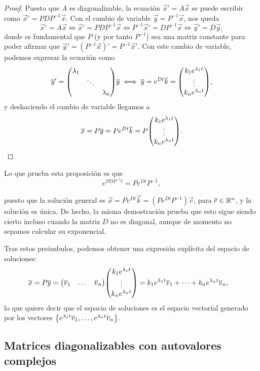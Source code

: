 \documentclass[../ecuaciones_diferenciales.tex]{subfiles}
\begin{document}
\begin{proof}
	Puesto que \(A\) es diagonalizable, la ecuación \(\vec{x}' = A\vec{x}\) 
	se puede escribir como
	\(\vec{x}' = P D P^{-1} \vec{x}\). Con el cambio de variable 
	\(\vec{y} = P^{-1}\vec{x}\), nos queda
	\[\vec{x}' = A\vec{x} \iff 
		\vec{x}' = PDP^{-1}\vec{x} \iff 
		P^{-1}\vec{x}' = DP^{-1}\vec{x} \iff \vec{y}' = D\vec{y},\]
	donde es fundamental que \(P\) (y por tanto \(P^{-1}\)) sea una matriz constante
	para poder afirmar que \(\vec{y}' = (P^{-1}\vec{x})' = P^{-1}\vec{x}'\). 
	Con este cambio de variable, podemos expresar la ecuación como
	\[\vec{y}' = \mat{\lambda_1 && \\ & \ddots & \\ && \lambda_n} \vec{y} \iff
		\vec{y} = e^{Dt}\vec{k} 
		= \mat{k_1 e^{\lambda_1 t} \\ \vdots \\ k_n e^{\lambda_n t}},\]
    y deshaciendo el cambio de variable llegamos a
    \[\vec{x} = P \vec{y} = P e^{Dt}\vec{k}= P \mat{k_1 e^{\lambda_1 t} \\ \vdots \\ k_n
          e^{\lambda_n t}}.\]
\end{proof}

\begin{remark}
    Lo que prueba esta proposición es que
    \[e^{PDP^{-1}t} = P e^{Dt} P^{-1},\]

    puesto que la solución general es
    \(\vec{x} = P e^{Dt} \vec{k} = \left( P e^{Dt} P^{-1} \right) \vec{c}\),
    para \(\overline{c} \in \mathbb{R}^n\), y la solución es única. De hecho, la misma
    demostración prueba que esto sigue siendo cierto incluso cuando la matriz
    \(D\) no es diagonal, aunque de momento no sepamos calcular su exponencial.
\end{remark}

Tras estos preámbulos, podemos obtener una expresión explícita del espacio de
soluciones:
\begin{align*}
	\vec{x} &= P\vec{y} = \mat{\vec{v}_1 & \dots & \vec{v}_n} 
		\mat{k_1 e^{\lambda_1 t} \\ \vdots \\ k_n e^{\lambda_n t}} =
	k_1 e^{\lambda_1 t} \vec{v}_1 + \cdots + k_n e^{\lambda_n t}\vec{v}_n,
\end{align*}
lo que quiere decir que el espacio de soluciones es el espacio vectorial
generado por los vectores
\(\set{e^{\lambda_1 t} \vec{v}_1, \dots, e^{\lambda_n t} \vec{v}_n}\).

\subsection{Matrices diagonalizables con autovalores complejos}
\end{document}
